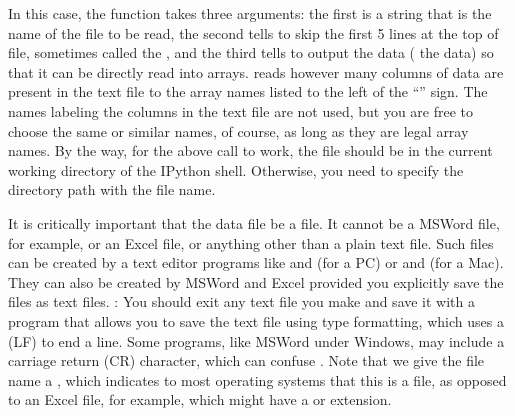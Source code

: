 \documentclass[letterpaper,10pt,english]{sphinxmanual}
\begin{document}
\begin{sphinxVerbatim}[commandchars=\\\{\}]
     
\end{sphinxVerbatim}

\sphinxAtStartPar
In this case, the  function takes three arguments: the first is a string that is the name of the file to be read, the second tells  to skip the first 5 lines at the top of file, sometimes called the , and the third tells  to output the data ( the data) so that it can be directly read into arrays.   reads however many columns of data are present in the text file to the array names listed to the left of the “\sphinxcode{\sphinxupquote{=}}” sign.  The names labeling the columns in the text file are not used, but you are free to choose the same or similar names, of course, as long as they are legal array names.  By the way, for the above  call to work, the file  should be in the current working directory of the IPython shell. Otherwise, you need to specify the directory path with the file name.

\sphinxAtStartPar
It is critically important that the data file be a  file.  It cannot be a MSWord file, for example, or an Excel file, or anything other than a plain text file.  Such files can be created by a text editor programs like  and  (for a PC) or  and  (for a Mac).  They can also be created by MSWord and Excel provided you explicitly save the files as text files.  : You should exit any text file you make and save it with a program that allows you to save the text file using \sphinxhyphen{}type formatting, which uses a  (LF) to end a line.  Some programs, like MSWord under Windows, may include a carriage return (CR) character, which can confuse .  Note that we give the file name a  , which indicates to most operating systems that this is a  file, as opposed to an Excel file, for example, which might have a  or  extension.
\end{document}
